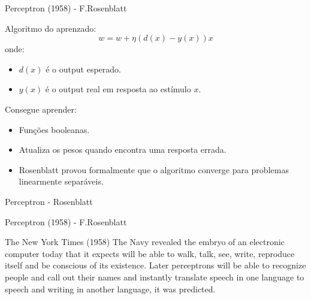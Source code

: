 \begin{frame}{Perceptron (1958) - F.Rosenblatt}
  \begin{block}{Algoritmo do aprenzado:}
    \[ w = w + \eta (d(x) - y(x)) x \]
    onde:
    \begin{itemize}
      \item $d(x)$ é o output esperado.
      \item $y(x)$ é o output real em resposta ao estímulo $x$.
    \end{itemize}
  \end{block}

  Consegue aprender:
  \begin{itemize}
    \item Funções booleanas.
    \item Atualiza os pesos quando encontra uma resposta errada.
    \item Rosenblatt provou formalmente que o algoritmo converge para problemas linearmente separáveis.
  \end{itemize}
\end{frame}

\begin{frame}{Perceptron - Rosenblatt}

  \begin{figure}
  \centering
  \end{figure}

  \begin{figure}
  \centering
  \end{figure}

\end{frame}

\begin{frame}{Perceptron (1958) - F.Rosenblatt}
  \begin{block}{The New York Times (1958) \cite{olazaran1996sociological}}
    The Navy revealed the embryo of an electronic computer today that it expects will be able to walk, talk, see, write, reproduce itself and be conscious of its existence. Later perceptrons will be able to recognize people and call out their names and instantly translate speech in one language to speech and writing in another language, it was predicted.
  \end{block}
\end{frame}


